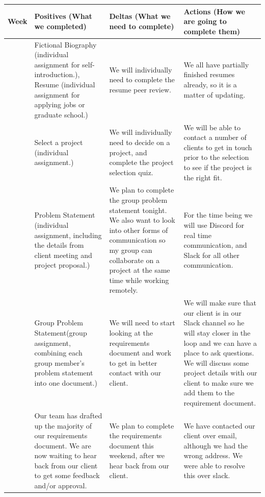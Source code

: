 \documentclass[onecolumn, draftclsnofoot,10pt, compsoc]{IEEEtran}
\begin{document}
\newcommand\rownumber{\stepcounter{magicrownumbers}\arabic{magicrownumbers}}
\begin{longtable}{ | c | *{3}{p{.3\linewidth} |} }
    \hline
    Week & Positives (What we completed) & Deltas (What we need to complete) & Actions (How we are going to complete them) \\ \hline
    \rownumber & 
    Fictional Biography (individual assignment for self-introduction.), Resume (individual assignment for applying jobs or graduate school.)
    & We will individually need to complete the resume peer review. 
    & We all have partially finished resumes already, so it is a matter of updating.  \\ \hline
    
    \rownumber & 
    Select a project (individual assignment.)
     & 
    We will individually need to decide on a project, and complete the project selection quiz. 
     & 
    We will be able to contact a number of clients to get in touch prior to the selection to see if the project is the right fit. 
    \\ \hline
    
    \rownumber & 
    Problem Statement (individual assignment, including the details from client meeting and project proposal.)
    & 
    We plan to complete the group problem statement tonight. We also want to look into other forms of communication so my group can collaborate on a project at the same time while working remotely.
     & 
    For the time being we will use Discord for real time communication, and Slack for all other communication. 
     \\ \hline
    
    \rownumber & 
    Group Problem Statement(group assignment, combining each group member's problem statement into one document.)
     & 
    We will need to start looking at the requirements document and work to get in better contact with our client. 
     & 
    We will make sure that our client is in our Slack channel so he will stay closer in the loop and we can have a place to ask questions. We will discuss some project details with our client to make sure we add them to the requirement document. 
     \\ \hline
    
    \rownumber & 
    Our team has drafted up the majority of our requirements document. We are now waiting to hear back from our client to get some feedback and/or approval. 
     & 
   We plan to complete the requirements document this weekend, after we hear back from our client. 
     & 
     We have contacted our client over email, although we had the wrong address. We were able to resolve this over slack.
     \\ \hline
     

\end{longtable}
\end{document}
